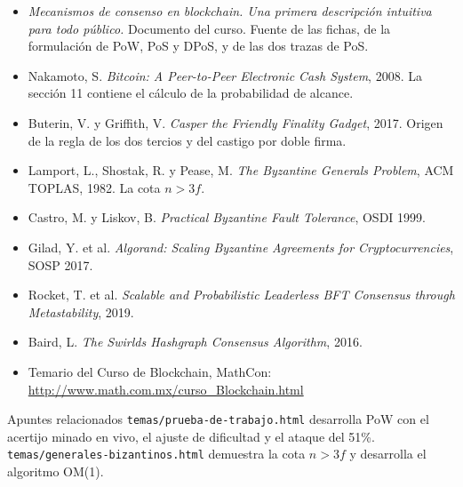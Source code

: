 \documentclass[11pt,a4paper]{article}
\theoremstyle{definition}
\theoremstyle{plain}
\theoremstyle{remark}
\begin{document}
\begin{itemize}[leftmargin=1.4em]
  \item \emph{Mecanismos de consenso en blockchain. Una primera descripción
        intuitiva para todo público.} Documento del curso. Fuente de las fichas,
        de la formulación de PoW, PoS y DPoS, y de las dos trazas de PoS.
  \item Nakamoto, S. \emph{Bitcoin: A Peer-to-Peer Electronic Cash System}, 2008.
        La sección 11 contiene el cálculo de la probabilidad de alcance.
  \item Buterin, V. y Griffith, V. \emph{Casper the Friendly Finality Gadget},
        2017. Origen de la regla de los dos tercios y del castigo por doble firma.
  \item Lamport, L., Shostak, R. y Pease, M. \emph{The Byzantine Generals
        Problem}, ACM TOPLAS, 1982. La cota $n > 3f$.
  \item Castro, M. y Liskov, B. \emph{Practical Byzantine Fault Tolerance},
        OSDI 1999.
  \item Gilad, Y. et al. \emph{Algorand: Scaling Byzantine Agreements for
        Cryptocurrencies}, SOSP 2017.
  \item Rocket, T. et al. \emph{Scalable and Probabilistic Leaderless BFT
        Consensus through Metastability}, 2019.
  \item Baird, L. \emph{The Swirlds Hashgraph Consensus Algorithm}, 2016.
  \item Temario del Curso de Blockchain, MathCon:
        \url{http://www.math.com.mx/curso_Blockchain.html}
\end{itemize}

\vspace{1em}
\begin{nota}{Apuntes relacionados}
\texttt{temas/prueba-de-trabajo.html} desarrolla PoW con el acertijo minado en
vivo, el ajuste de dificultad y el ataque del 51\%.
\texttt{temas/generales-bizantinos.html} demuestra la cota $n > 3f$ y desarrolla
el algoritmo OM(1).
\end{nota}
\end{document}
